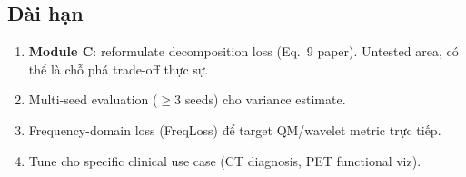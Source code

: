 \subsection{Dài hạn}
\begin{enumerate}
    \item \textbf{Module C}: reformulate decomposition loss (Eq.~9 paper). Untested area, có thể là chỗ phá trade-off thực sự.
    \item Multi-seed evaluation ($\geq 3$ seeds) cho variance estimate.
    \item Frequency-domain loss (FreqLoss) để target QM/wavelet metric trực tiếp.
    \item Tune cho specific clinical use case (CT diagnosis, PET functional viz).
\end{enumerate}
